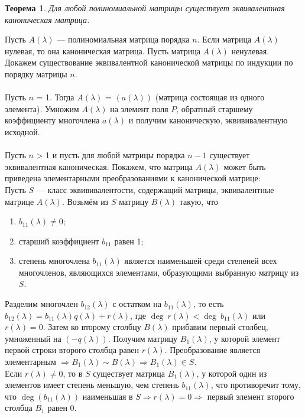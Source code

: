 \newtheorem*{th12_1_1}{Теорема}\begin{th12_1_1} Для любой полиномиальной матрицы существует эквивалентная каноническая матрица.
\end{th12_1_1}
\begin{Proof}
	Пусть $A(\lambda)$ --- полиномиальная матрица порядка $n$. Если матрица $A(\lambda)$ нулевая, то она каноническая матрица. Пусть матрица $A(\lambda)$ ненулевая. Докажем существование эквивалентной канонической матрицы по индукции по порядку матрицы $n$.\\\\
	Пусть $n$ = 1. Тогда $A(\lambda)$ = $(a(\lambda))$ (матрица состоящая из одного элемента). Умножим $A(\lambda)$ на элемент поля $P$, обратный старшему коэффициенту многочлена $a(\lambda)$ и получим каноническую, эквививалентную исходной.\\\\
	Пусть $n$ > 1 и пусть для любой матрицы порядка $n-1$ существует эквивалентная каноническая. Покажем, что матрица $A(\lambda)$ может быть приведена элементарными преобразованиями к канонической матрице:\\
	Пусть $S$ --- класс эквививалентости, содержащий матрицы, эквивалентные матрице $A(\lambda)$. Возьмём из $S$ матрицу $B(\lambda)$ такую, что\begin{enumerate}
		\item $b_{11}(\lambda) \not= 0$;
		\item старший коэффициент $b_{11}$ равен 1;
		\item степень многочлена $b_{11}(\lambda)$ является наименьшей среди степеней всех многочленов, являющихся элементами, образующими выбранную матрицу из $S$.
	\end{enumerate}
	Разделим многочлен $b_{12}(\lambda)$ с остатком на $b_{11}(\lambda)$, то есть $b_{12}(\lambda) = b_{11}(\lambda)q(\lambda) + r(\lambda)$, где $\deg \ r(\lambda) < \deg \ b_{11}(\lambda)$ или $r(\lambda) = 0$. Затем ко второму столбцу $B(\lambda)$ прибавим первый столбец, умноженный на $(-q(\lambda))$. Получим матрицу $B_1(\lambda)$, у которой элемент первой строки второго столбца равен $r(\lambda)$. Преобразование является элементарным $\Rightarrow B_1(\lambda) \sim B(\lambda) \Rightarrow B_1(\lambda) \in S$.\\
	Если $r(\lambda) \not= 0$, то в $S$ существует матрица $B_1(\lambda)$, у которой один из элементов имеет степень меньшую, чем степень $b_{11}(\lambda)$, что противоречит тому, что $\deg (b_{11}(\lambda))$ наименьшая в $S \Rightarrow r(\lambda) = 0 \Rightarrow$ первый элемент второго столбца $B_1$ равен 0.\\

\end{Proof}
